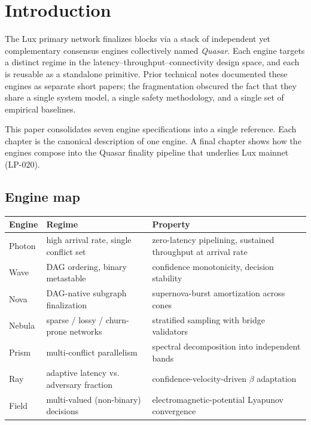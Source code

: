 \chapter{Introduction}
\label{ch:lce-introduction}

The Lux primary network finalizes blocks via a stack of independent yet
complementary consensus engines collectively named \emph{Quasar}. Each
engine targets a distinct regime in the latency--throughput--connectivity
design space, and each is reusable as a standalone primitive. Prior
technical notes documented these engines as separate short papers; the
fragmentation obscured the fact that they share a single system model, a
single safety methodology, and a single set of empirical baselines.

This paper consolidates seven engine specifications into a single
reference. Each chapter is the canonical description of one engine. A
final chapter shows how the engines compose into the Quasar finality
pipeline that underlies Lux mainnet (LP-020).

\section*{Engine map}

\begin{center}
\renewcommand{\arraystretch}{1.2}
\begin{tabular}{p{2.4cm}p{4.2cm}p{6.6cm}}
\toprule
\textbf{Engine} & \textbf{Regime} & \textbf{Property} \\
\midrule
Photon  & high arrival rate, single conflict set & zero-latency pipelining, sustained throughput at arrival rate \\
Wave    & DAG ordering, binary metastable        & confidence monotonicity, decision stability \\
Nova    & DAG-native subgraph finalization       & supernova-burst amortization across cones \\
Nebula  & sparse / lossy / churn-prone networks  & stratified sampling with bridge validators \\
Prism   & multi-conflict parallelism             & spectral decomposition into independent bands \\
Ray     & adaptive latency vs. adversary fraction & confidence-velocity-driven $\beta$ adaptation \\
Field   & multi-valued (non-binary) decisions    & electromagnetic-potential Lyapunov convergence \\
\bottomrule
\end{tabular}
\end{center}


